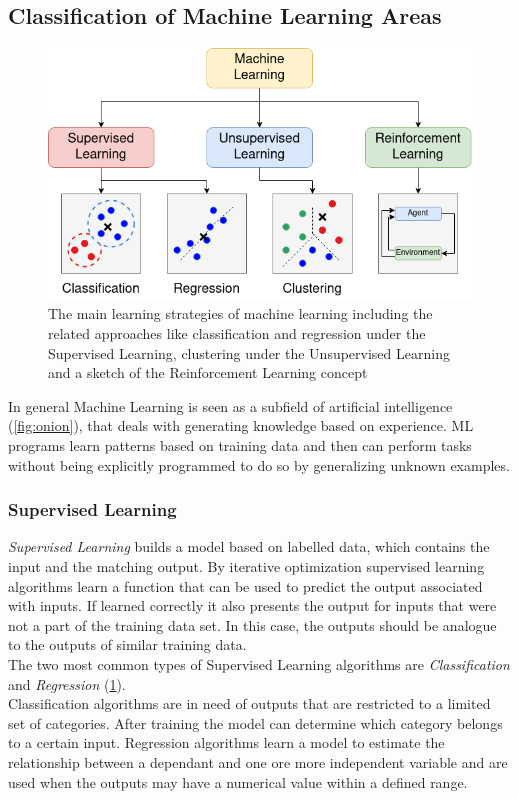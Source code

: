 \newpage

\subsection{Classification of Machine Learning Areas}
\begin{figure}
	\centering
	\includegraphics[width=\linewidth]{figures/mlpng.png}
	\caption{The main learning strategies of machine learning including the related approaches like classification and regression under the Supervised Learning, clustering under the Unsupervised Learning and a sketch of the Reinforcement Learning concept}
	\label{fig:ml}
\end{figure}
In general Machine Learning is seen as a subfield of artificial intelligence (\cref{fig:onion}), that deals with generating knowledge based on experience. ML programs learn patterns based on training data and then can perform tasks without being explicitly programmed to do so by generalizing unknown examples. 
\subsubsection{Supervised Learning}
\emph{Supervised Learning} builds a model based on labelled data, which contains the input and the matching output.
By iterative optimization supervised learning algorithms learn a function that can be used to predict the output associated with inputs. If learned correctly it also presents the output for inputs that were not a part of the training data set. In this case, the outputs should be analogue to the outputs of similar training data.\\
The two most common types of Supervised Learning algorithms are \emph{Classification} and \emph{Regression} (\cref{fig:ml}).\\
Classification algorithms are in need of outputs that are restricted to a limited set of categories. After training the model can determine which category belongs to a certain input.
Regression algorithms learn a model to estimate the relationship between a dependant and one ore more independent variable and are used when the outputs may have a numerical value within a defined range.\\

